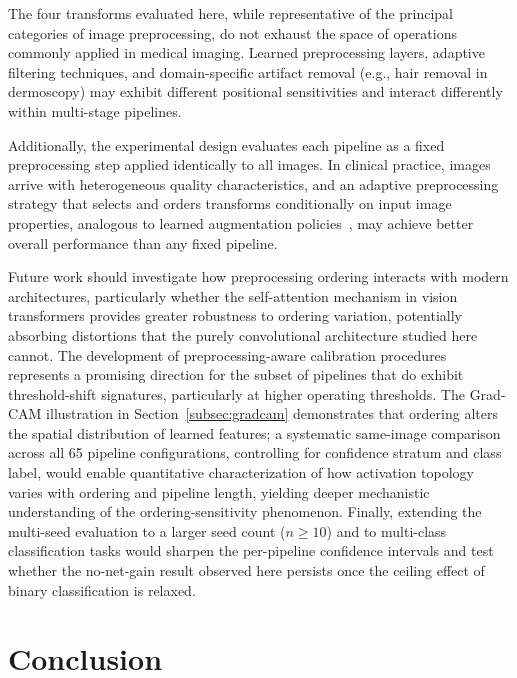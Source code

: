 \documentclass[preprint,5p,times,twocolumn]{elsarticle}
\begin{document}
The four transforms evaluated here, while representative of the principal categories of image preprocessing, do not exhaust the space of operations commonly applied in medical imaging. Learned preprocessing layers, adaptive filtering techniques, and domain-specific artifact removal (e.g., hair removal in dermoscopy) may exhibit different positional sensitivities and interact differently within multi-stage pipelines.

Additionally, the experimental design evaluates each pipeline as a fixed preprocessing step applied identically to all images. In clinical practice, images arrive with heterogeneous quality characteristics, and an adaptive preprocessing strategy that selects and orders transforms conditionally on input image properties, analogous to learned augmentation policies~\cite{Shorten2019, Cubuk2019, Cubuk2020}, may achieve better overall performance than any fixed pipeline.

Future work should investigate how preprocessing ordering interacts with modern architectures, particularly whether the self-attention mechanism in vision transformers provides greater robustness to ordering variation, potentially absorbing distortions that the purely convolutional architecture studied here cannot. The development of preprocessing-aware calibration procedures represents a promising direction for the subset of pipelines that do exhibit threshold-shift signatures, particularly at higher operating thresholds. The Grad-CAM illustration in Section~\ref{subsec:gradcam} demonstrates that ordering alters the spatial distribution of learned features; a systematic same-image comparison across all 65 pipeline configurations, controlling for confidence stratum and class label, would enable quantitative characterization of how activation topology varies with ordering and pipeline length, yielding deeper mechanistic understanding of the ordering-sensitivity phenomenon. Finally, extending the multi-seed evaluation to a larger seed count ($n \geq 10$) and to multi-class classification tasks would sharpen the per-pipeline confidence intervals and test whether the no-net-gain result observed here persists once the ceiling effect of binary classification is relaxed.


\section{Conclusion}
\label{sec:conclusion}
\end{document}
